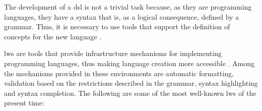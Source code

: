 The development of a \ac{dsl} is not a trivial task because, as they are programming languages, they have a syntax that is, as a logical consequence, defined by a grammar.
Thus, it is necessary to use tools that support the definition of concepts for the new language \cite{Fowler:2005}.

\acp{lw} are tools that provide infrastructure mechanisms for implementing programming languages, thus making language creation more accessible \cite{Wachsmuth:2014}.
Among the mechanisms provided in these environments are automatic formatting, validation based on the restrictions described in the grammar, syntax highlighting and syntax completion.
The following are some of the most well-known \acp{lw} of the present time:

    
